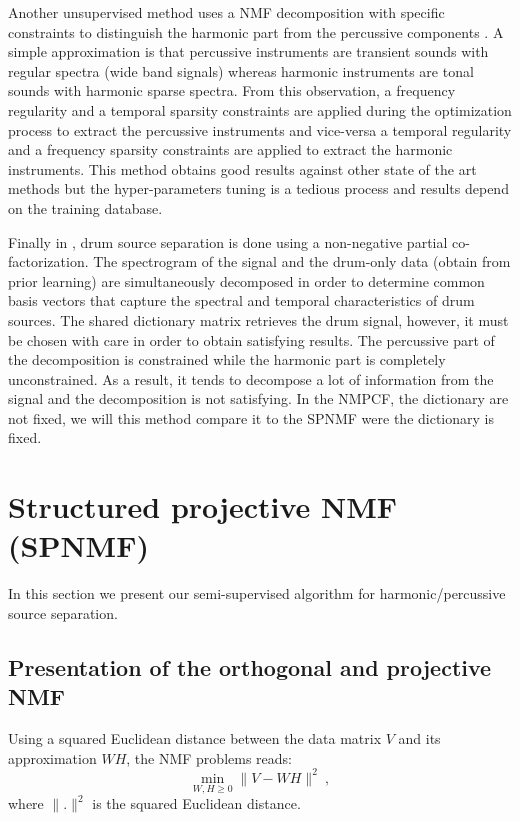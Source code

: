 \documentclass[journal]{IEEEtran}
\begin{document}
Another unsupervised method uses a NMF decomposition with specific constraints to distinguish the harmonic part from the percussive components \cite{canadas2014percussive}. A simple approximation is that percussive instruments are transient sounds with regular spectra (wide band signals) whereas harmonic instruments are tonal sounds with harmonic sparse spectra. From this observation, a frequency regularity and a temporal sparsity constraints are applied during the optimization process to extract the percussive instruments and vice-versa a temporal regularity and a frequency sparsity constraints are applied to extract the harmonic instruments. This method obtains good results against other state of the art methods \cite{canadas2014percussive} but the hyper-parameters tuning is a tedious process and results depend on the training database.

Finally in \cite{kim2011nonnegative}, drum source separation is done using a non-negative partial co-factorization. The spectrogram of the signal and the drum-only data (obtain from prior learning) are simultaneously decomposed in order to determine common basis vectors that capture the spectral and temporal characteristics of drum sources. The shared dictionary matrix retrieves the drum signal, however, it must be chosen with care in order to obtain satisfying results. The percussive part of the decomposition is constrained while the harmonic part is completely unconstrained. As a result, it tends to decompose a lot of information from the signal and the decomposition is not satisfying. In the NMPCF, the dictionary are not fixed, we will this method compare it to the SPNMF were the dictionary is fixed. 


\section{Structured projective NMF (SPNMF)}
\label{sec:SPNMF}

In this section we present our semi-supervised algorithm for harmonic/percussive source separation.

\subsection{Presentation of the orthogonal and projective NMF}\label{subsec:PNMF}


Using a squared Euclidean distance between the data matrix $V$ and its approximation $WH$, the NMF problems reads:
$$
\min_{W,H\geq 0} \|V - WH\|^2\ , 
$$
where $\|.\|^{2}$ is the squared Euclidean distance.
\end{document}
